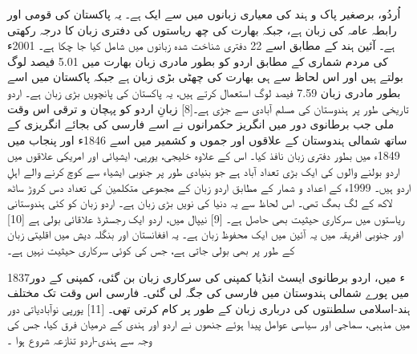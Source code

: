 \documentclass[a4paper,12pt,oneside,final]{article}
\begin{document}
اُردُو، برصغیر پاک و ہند کی معیاری زبانوں میں سے ایک ہے۔ یہ پاکستان کی قومی اور رابطہ عامہ کی زبان ہے، جبکہ بھارت کی چھ ریاستوں کی دفتری زبان کا درجہ رکھتی ہے۔ آئین ہند کے مطابق اسے 22 دفتری شناخت شدہ زبانوں میں شامل کیا جا چکا ہے۔ 2001ء کی مردم شماری کے مطابق اردو کو بطور مادری زبان بھارت میں 5.01 فیصد لوگ بولتے ہیں اور اس لحاظ سے ہی بھارت کی چھٹی بڑی زبان ہے جبکہ پاکستان میں اسے بطور مادری زبان 7.59 فیصد لوگ استعمال کرتے ہیں، یہ پاکستان کی پانچویں بڑی زبان ہے۔ اردو تاریخی طور پر ہندوستان کی مسلم آبادی سے جڑی ہے۔[8] زبانِ اردو کو پہچان و ترقی اس وقت ملی جب برطانوی دور میں انگریز حکمرانوں نے اسے فارسی کی بجائے انگریزی کے ساتھ شمالی ہندوستان کے علاقوں اور جموں و کشمیر میں اسے 1846ء اور پنجاب میں 1849ء میں بطور دفتری زبان نافذ کیا۔ اس کے علاوہ خلیجی، یورپی، ایشیائی اور امریکی علاقوں میں اردو بولنے والوں کی ایک بڑی تعداد آباد ہے جو بنیادی طور پر جنوبی ایشیاء سے کوچ کرنے والے اہلِ اردو ہیں۔ 1999ء کے اعداد و شمار کے مطابق اردو زبان کے مجموعی متکلمین کی تعداد دس کروڑ ساٹھ لاکھ کے لگ بھگ تھی۔ اس لحاظ سے یہ دنیا کی نویں بڑی زبان ہے۔ اردو زبان کو کئی ہندوستانی ریاستوں میں سرکاری حیثیت بھی حاصل ہے۔ [9] نیپال میں، اردو ایک رجسٹرڈ علاقائی بولی ہے [10] اور جنوبی افریقہ میں یہ آئین میں ایک محفوظ زبان ہے۔ یہ افغانستان اور بنگلہ دیش میں اقلیتی زبان کے طور پر بھی بولی جاتی ہے، جس کی کوئی سرکاری حیثیت نہیں ہے۔

1837ء میں، اردو برطانوی ایسٹ انڈیا کمپنی کی سرکاری زبان بن گئی، کمپنی کے دور میں پورے شمالی ہندوستان میں فارسی کی جگہ لی گئی۔ فارسی اس وقت تک مختلف ہند-اسلامی سلطنتوں کی درباری زبان کے طور پر کام کرتی تھی۔ [11] یورپی نوآبادیاتی دور میں مذہبی، سماجی اور سیاسی عوامل پیدا ہوئے جنھوں نے اردو اور ہندی کے درمیان فرق کیا، جس کی وجہ سے ہندی-اردو تنازعہ شروع ہوا ۔
\end{document}
